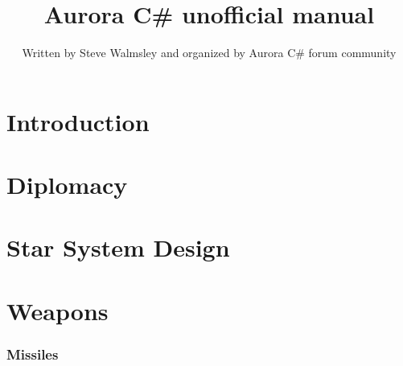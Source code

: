 \documentclass[10pt,a4paper,oneside]{article}
\author{Written by Steve Walmsley and organized by Aurora C\# forum community}
\title{Aurora C\# unofficial manual}
\begin{document}
\maketitle
\newpage
\tableofcontents


\newpage
\part{Introduction}




\newpage
\part{Diplomacy}










\newpage
\part{Star System Design}









\newpage
\part{Weapons}

\section{Missiles}








\end{document}
